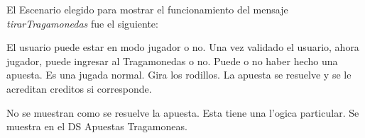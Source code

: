 % 
% 


El Escenario elegido para mostrar el funcionamiento del mensaje \textit{tirarTragamonedas} fue el siguiente:

 \escenario
 { El usuario puede estar en modo jugador o no. Una vez validado el usuario, ahora jugador, puede ingresar al Tragamonedas o no. Puede o no haber hecho una apuesta. Es una jugada normal. Gira los rodillos. La apuesta se resuelve y se le acreditan creditos si corresponde.}

No se muestran como se resuelve la apuesta. Esta tiene una l'ogica particular. Se muestra en el DS Apuestas Tragamoneas.


